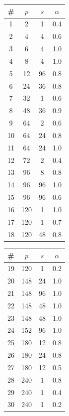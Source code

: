 \begin{table}[h!]
\centering
\begin{minipage}[t]{0.48\linewidth}
\centering
\begin{tabular}{@{}cccc@{}}
\toprule
\# & $p$ & $s$ & $\alpha$ \\
\midrule
1  & 2    & 1   & 0.4 \\
2  & 4    & 4   & 0.6 \\
3  & 6    & 4   & 1.0 \\
4  & 8    & 4   & 1.0 \\
5  & 12   & 96  & 0.8 \\
6  & 24   & 36  & 0.8 \\
7  & 32   & 1   & 0.6 \\
8  & 48   & 36  & 0.9 \\
9  & 64   & 2   & 0.6 \\
10 & 64   & 24  & 0.8 \\
11 & 64   & 24  & 1.0 \\
12 & 72   & 2   & 0.4 \\
13 & 96   & 8   & 0.8 \\
14 & 96   & 96  & 1.0 \\
15 & 96   & 96  & 0.6 \\
16 & 120  & 1   & 1.0 \\
17 & 120  & 1   & 0.7 \\
18 & 120  & 48  & 0.8 \\
\bottomrule
\end{tabular}
\end{minipage}
\hfill
\begin{minipage}[t]{0.48\linewidth}
\centering
\begin{tabular}{@{}cccc@{}}
\toprule
\# & $p$ & $s$ & $\alpha$ \\
\midrule
19 & 120  & 1   & 0.2 \\
20 & 148  & 24  & 1.0 \\
21 & 148  & 96  & 1.0 \\
22 & 148  & 48  & 1.0 \\
23 & 148  & 48  & 1.0 \\
24 & 152  & 96  & 1.0 \\
25 & 180  & 12  & 0.8 \\
26 & 180  & 24  & 0.8 \\
27 & 180  & 12  & 0.5 \\
28 & 240  & 1   & 0.8 \\
29 & 240  & 1   & 0.4 \\
30 & 240  & 1   & 0.2 \\

\end{tabular}
\end{minipage}
\end{table}
